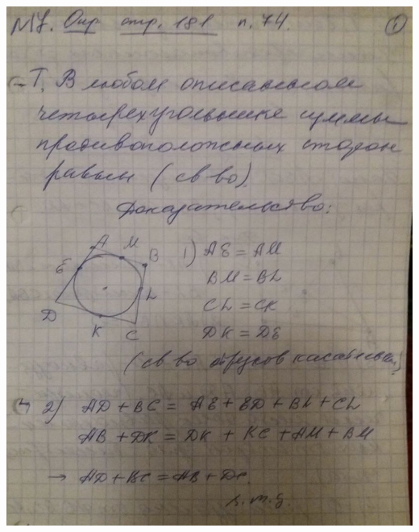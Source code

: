 \documentclass[12pt, letterpaper]{article}
\begin{document}
\includegraphics[scale=0.3]{solve17.jpg} \\
\end{document}

